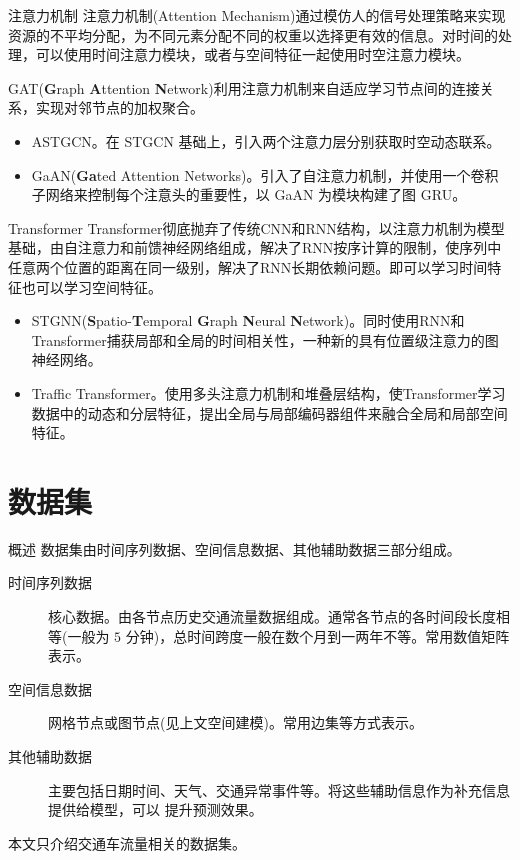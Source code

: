 \documentclass{libs/format}
\begin{document}
\begin{frame}{注意力机制}
  注意力机制(Attention Mechanism)通过模仿人的信号处理策略来实现资源的不平均分配，为不同元素分配不同的权重以选择更有效的信息\cite{T-ZS26}。对时间的处理，可以使用时间注意力模块，或者与空间特征一起使用时空注意力模块。
  
  GAT(\textbf{G}raph \textbf{A}ttention \textbf{N}etwork)利用注意力机制来自适应学习节点间的连接关系，实现对邻节点的加权聚合。

  \begin{itemize}
    \item ASTGCN\cite{T-81}。在 STGCN 基础上，引入两个注意力层分别获取时空动态联系。
    \item GaAN(\textbf{Ga}ted Attention Networks)\cite{T-88}。引入了自注意力机制，并使用一个卷积子网络来控制每个注意头的重要性，以 GaAN 为模块构建了图 GRU。
  \end{itemize}
\end{frame}

\begin{frame}{Transformer}
  Transformer彻底抛弃了传统CNN和RNN结构，以注意力机制为模型基础，由自注意力和前馈神经网络组成，解决了RNN按序计算的限制，使序列中任意两个位置的距离在同一级别，解决了RNN长期依赖问题。\cite{T-ZS6}即可以学习时间特征也可以学习空间特征。

  \begin{itemize}
    \item STGNN(\textbf{S}patio-\textbf{T}emporal \textbf{G}raph \textbf{N}eural \textbf{N}etwork)\cite{T-173}。同时使用RNN和Transformer捕获局部和全局的时间相关性，一种新的具有位置级注意力的图神经网络。
    \item Traffic Transformer\cite{T-202}。使用多头注意力机制和堆叠层结构，使Transformer学习数据中的动态和分层特征，提出全局与局部编码器组件来融合全局和局部空间特征。
  \end{itemize}
\end{frame}

\section{数据集}

\begin{frame}{概述}
  数据集由时间序列数据、空间信息数据、其他辅助数据三部分组成。
  \begin{description}
    \item[时间序列数据] 核心数据。由各节点历史交通流量数据组成。通常各节点的各时间段长度相等(一般为 $5$ 分钟)，总时间跨度一般在数个月到一两年不等。常用数值矩阵表示。
    \item[空间信息数据] 网格节点或图节点(见上文空间建模)。常用边集等方式表示。
    \item[其他辅助数据] 主要包括日期时间、天气、交通异常事件等。将这些辅助信息作为补充信息提供给模型，可以
    提升预测效果。
  \end{description}
  本文只介绍交通车流量相关的数据集。
\end{frame}
\end{document}
